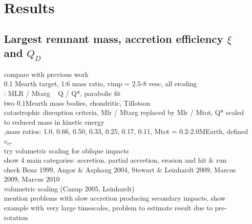 \section{Results}
\subsection{Largest remnant mass, accretion efficiency $\xi$ and $Q_D$}
compare with previous work\\
\cite{Benz:1988p3336} 0.1 Mearth target, 1:6 mass ratio, vimp = 2.5-8 vesc, all eroding\\
\cite{Benz1999Icar..142....5B}: MLR / Mtarg ~ Q / Q*, parabolic fit \\
\cite{Agnor:2004p3329}  two 0.1Mearth mass bodies, chondritic, Tillotson \\
\cite{Stewart:2009p3265} catastrophic disruption criteria, Mlr / Mtarg replaced by Mlr / Mtot, Q* scaled to reduced mass in kinetic energy \\ 
\cite{2010ApJ...714L..21K} ,mass ratios: 1.0, 0.66, 0.50, 0.33, 0.25, 0.17, 0.11, Mtot = 0.2-2.0MEarth, defined $v_{cr}$ \\
try volumetric scaling for oblique impacts \\
show 4 main categories: accretion, partial accretion, erosion and hit \& run \\
check Benz 1999, Angor \& Asphaug 2004, Stewart \& Leinhardt 2009, Marcus 2009, Marcus 2010 \\
volumetric scaling (Canup 2005, Leinhardt) \\
mention problems with slow accretion producing secondary impacts, show example with very large timescales, problem to estimate result due to pre-rotation\\

